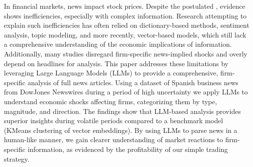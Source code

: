 In financial markets, news impact stock prices. Despite the postulated , evidence shows inefficiencies, especially with complex information. Research attempting to explain such inefficiencies has often relied on dictionary-based methods, sentiment analysis, topic modeling, and more recently, vector-based models,
which still lack a comprehensive understanding of the economic implications of information. Additionally, many studies disregard firm-specific news-implied shocks and overly depend on headlines for analysis. This paper addresses these limitations by leveraging Large Language Models (LLMs) to provide a comprehensive, firm-specific analysis of full news articles. 
Using a dataset of Spanish business news from DowJones Newswires during a period of high uncertainty 
we apply LLMs to understand economic shocks affecting firms, categorizing them by type, magnitude, and direction. The findings show that LLM-based analysis provides superior insights during volatile periods compared to a benchmark model (KMeans clustering of vector embeddings). By using LLMs to parse news in a human-like manner, we gain clearer understanding of market reactions to firm-specific information, as evidenced by the profitability of our simple trading strategy.

